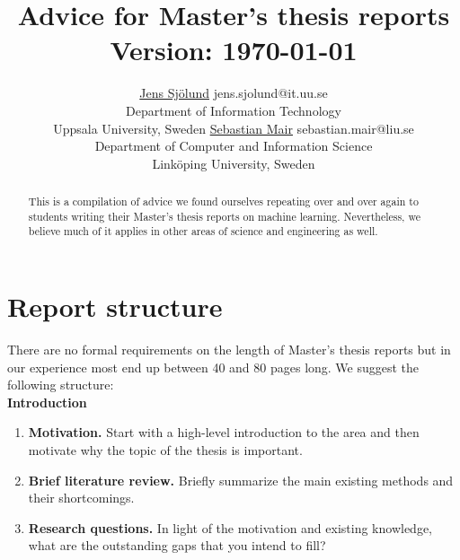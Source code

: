\documentclass[twoside,11pt]{article}
\begin{document}
\title{Advice for Master's thesis reports\\\normalsize{Version: \today}}

\author{\name \href{https://jsjol.github.io/}{Jens Sjölund} \email jens.sjolund@it.uu.se \\
        \addr Department of Information Technology \\
        Uppsala University, Sweden
        \AND
        \name \href{https://smair.github.io/}{Sebastian Mair} \email sebastian.mair@liu.se \\
        \addr Department of Computer and Information Science \\
        Linköping University, Sweden
    }


\maketitle

\begin{abstract}%
This is a compilation of advice we found ourselves repeating over and over again to students writing their Master's thesis reports on machine learning. Nevertheless, we believe much of it applies in other areas of science and engineering as well.  
\end{abstract}


\section{Report structure}
There are no formal requirements on the length of Master's thesis reports but in our experience most end up between 40 and 80 pages long. We suggest the following structure:\\ 

\noindent\textbf{Introduction}

    \begin{enumerate}
        \item \textbf{Motivation.} Start with a high-level introduction to the area and then motivate why the topic of the thesis is important.
        \item \textbf{Brief literature review.} Briefly summarize the main existing methods and their shortcomings.
        \item \textbf{Research questions.} In light of the motivation and existing knowledge, what are the outstanding gaps that you intend to fill?
    \end{enumerate}
\end{document}
